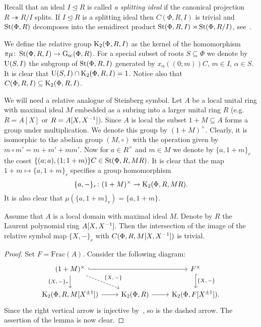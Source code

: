 Recall that an ideal $I \trianglelefteq R$ is called \textit{a splitting ideal} if the canonical projection $R \twoheadrightarrow R/I$ splits.
If $I \trianglelefteq R$ is a splitting ideal then $C(\Phi, R, I)$ is trivial and $\operatorname{St}(\Phi, R)$ decomposes into the semidirect product
 $\operatorname{St}(\Phi, R, I) \rtimes \operatorname{St}(\Phi, R/I)$, see~\cite[\S~1]{LS17}.

We define the relative group $\operatorname{K}_2(\Phi, R, I)$ as the kernel of the homomorphism $\pi \mu \colon \operatorname{St}(\Phi,R, I) \to \operatorname{G}_\mathrm{sc}(\Phi, R)$.
For a special subset of roots $S \subseteq \Phi$ we denote by $\operatorname{U}(S, I)$ the subgroup of $\operatorname{St}(\Phi, R, I)$ generated by $x_\alpha((0;m))C$, $m \in I$, $\alpha \in S$.
It is clear that $\operatorname{U}(S, I) \cap \operatorname{K}_2(\Phi, R, I) = 1$.
Notice also that $C(\Phi, R, I) \subseteq \operatorname{K}_2(\Phi, R, I)$.

We will need a relative analogue of Steinberg symbol.
Let $A$ be a local unital ring with maximal ideal $M$ embedded as a subring into a larger unital ring $R$ (e.g. $R = A[X]$ or $R = A[X, X^{-1}]$).
Since $A$ is local the subset $1+M \subseteq A$ forms a group under multiplication.
We denote this group by $(1+M)^\times$.
Clearly, it is isomorphic to the abelian group $(M, \circ)$ with the operation given by $m \circ m' = m + m' + mm'$.
Now for $a \in R^\times$ and $m \in M$ we denote by $\{a, 1+m\}_r$ the coset $\{(a; a), (1; 1+m)\}C \in \operatorname{St}(\Phi, R, MR)$.
It is clear that the map $1+m \mapsto \{a, 1+m\}_r$ specifies a group homomorphism
\begin{equation} \label{eq:relative-symbol} \{ a, -\}_r \colon (1+M)^\times \to \operatorname{K}_2(\Phi, R, MR). \end{equation}
It is also clear that $\mu(\{a, 1+m\}_r) = \{a, 1+m\}$.

\begin{lemma}\label{lem:symbols}
Assume that $A$ is a local domain with maximal ideal $M$.
Denote by $R$ the Laurent polynomial ring $A[X, X^{-1}]$.
Then the intersection of the image of the relative symbol map $\{X, -\}_r$ with $C(\Phi, R, M[X, X^{-1}])$ is trivial.
\end{lemma}
\begin{proof}
    Set $F = \mathrm{Frac}(A)$.
    Consider the following diagram:
    \[\begin{tikzcd}
    (1+M)^\times \ar[hookrightarrow, rr] \arrow{d}[swap]{\{X {,}\, -\}_r} \ar[rd, dashed, "\{X{,}\, -\}"] &  & F^\times \ar[hookrightarrow, d, "\{X{,}\, -\}"] \\
    \K_2(\Phi ,R, M[X^{\pm 1}]) \ar[r] & \K_2(\Phi, R) \ar[r] & \K_2(\Phi, F[X^{\pm 1}]).
    \end{tikzcd}\]
    Since the right vertical arrow is injective by~\cite[Lemma~2.2]{LS20}, so is the dashed arrow.
    The assertion of the lemma is now clear.
\end{proof}

